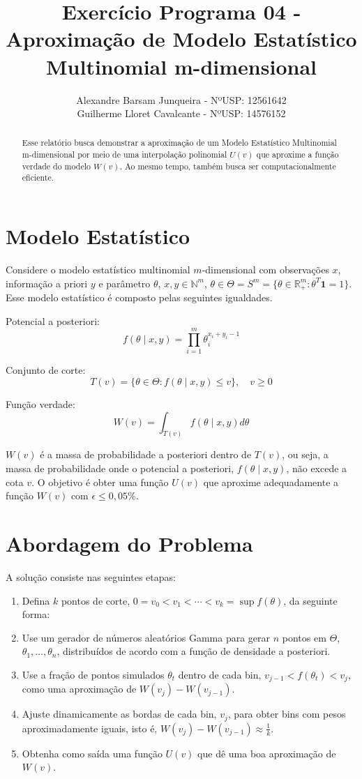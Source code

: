 \documentclass{article}
\title{Exercício Programa 04 - Aproximação de Modelo Estatístico Multinomial m-dimensional}
\author{Alexandre Barsam Junqueira - NºUSP: 12561642\\Guilherme Lloret Cavalcante - NºUSP: 14576152}
\begin{document}
\maketitle

\begin{abstract}
Esse relatório busca demonstrar a aproximação de um Modelo Estatístico Multinomial m-dimensional por meio de uma interpolação polinomial $U(v)$ que aproxime a função verdade do modelo $W(v)$. Ao mesmo tempo, também busca ser computacionalmente eficiente.
\end{abstract}

\section{Modelo Estatístico}
Considere o modelo estatístico multinomial $m$-dimensional com observações $x$, informação a priori $y$ e parâmetro $\theta$,
$x,y \in \mathbb{N}^m$, $\theta \in \Theta = S^m = \{\theta \in \mathbb{R}^m_+ : \theta^T \mathbf{1} = 1\}$. Esse modelo estatístico é composto pelas seguintes igualdades.

Potencial a posteriori:
\[ f(\theta \mid x,y) = \prod_{i=1}^{m} \theta^{x_i + y_i - 1}_i \]

Conjunto de corte:
\[ T(v) = \{\theta \in \Theta : f(\theta \mid x,y) \leq v\}, \quad v \geq 0 \]

Função verdade:
\[ W(v) = \int_{T(v)} f(\theta \mid x,y) d\theta \]

$W(v)$ é a massa de probabilidade a posteriori dentro de $T(v)$, ou seja, a massa de probabilidade onde o potencial a posteriori, $f(\theta \mid x,y)$, não excede a cota $v$. O objetivo é obter uma função $U(v)$ que aproxime adequadamente a função $W(v)$ com $\epsilon \leq 0,05\%$.

\section{Abordagem do Problema}
A solução consiste nas seguintes etapas:

\begin{enumerate}
    \item Defina $k$ pontos de corte, $0=v_0 < v_1 < \cdots < v_k = \sup f(\theta)$, da seguinte forma:

    \item Use um gerador de números aleatórios Gamma para gerar $n$ pontos em $\Theta$, $\theta_1, \ldots, \theta_n$, distribuídos de acordo com a função de densidade a posteriori.
    
    \item Use a fração de pontos simulados $\theta_t$ dentro de cada bin, $v_{j-1} < f(\theta_t) < v_j$, como uma aproximação de $W(v_j) - W(v_{j-1})$.
    
    \item Ajuste dinamicamente as bordas de cada bin, $v_j$, para obter bins com pesos aproximadamente iguais, isto é, $W(v_j) - W(v_{j-1}) \approx \frac{1}{k}$.
    
    \item Obtenha como saída uma função $U(v)$ que dê uma boa aproximação de $W(v)$.
\end{enumerate}
\end{document}

